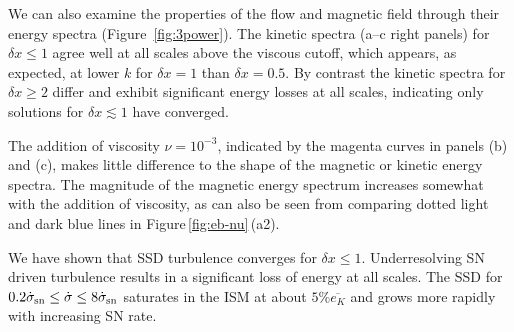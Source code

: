 \documentclass[preprint2]{aastex63}
\newcommand\SNr{\dot\sigma_{\rm sn}}
\newcommand\dx{ {\delta x}}
\begin{document}
 {We can also examine the properties of the flow and magnetic field through
 their energy spectra (Figure~\ref{fig:3power}).
 The kinetic spectra (a--c right panels) for $\dx\leq1$ agree well at 
 all scales above the viscous cutoff, which appears, as expected, at lower $k$ for
 $\dx=1$ than $\dx=0.5$.
 By contrast the kinetic spectra for $\dx\geq2$ differ and exhibit significant
 energy losses at all scales,    
 indicating only solutions for $\dx\lesssim1$ have converged.}

 {The addition of viscosity $\nu=10^{-3}$, indicated by the magenta curves in
 panels (b) and (c), {makes little difference to the shape of the
   magnetic or kinetic energy spectra.  The magnitude of the magnetic
   energy spectrum increases somewhat with the addition of viscosity,
   as can also be seen from comparing dotted light and dark blue
   lines in Figure\,\ref{fig:eb-nu}\,(a2).}
   }

 {We have shown that SSD turbulence {converges} for $\dx\leq1$.
 Underresolving SN driven turbulence results in a significant loss of energy
 at all scales. {The}
 SSD for $0.2\SNr\leq \dot\sigma \leq 8\SNr$ saturates in the ISM at about
 $5\%\overline{e_K}$ and grows more rapidly with increasing SN rate.
 } 
\end{document}
